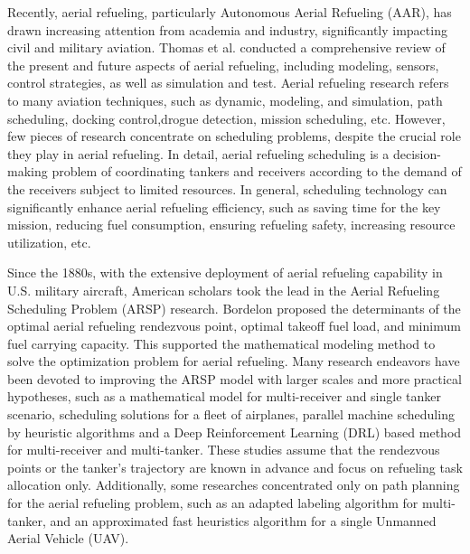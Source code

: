 Recently, aerial refueling, particularly Autonomous Aerial Refueling (AAR), has drawn increasing attention from academia and industry, significantly impacting civil and military aviation. \cite{thomas2014advances,ro2011dynamics,yin2022hose,dai2016modeling,tsukerman2018optimal}Thomas et al. conducted a comprehensive review of the present and future aspects of aerial refueling, including modeling, sensors, control strategies, as well as simulation and test. \cite{thomas2014advances}Aerial refueling research refers to many aviation techniques, such as dynamic, modeling, and simulation, \cite{ro2011dynamics,yin2022hose,dai2016modeling,tsukerman2018optimal}path scheduling, \cite{oh2013rendezvous,hansknecht2023feeder}docking control,\cite{quan2014survey,duan2020bionic,valasek2017fault,jinrui2020docking}drogue detection, \cite{rasol2023n,wang2017drogue}mission scheduling, \cite{hansknecht2023feeder,sundar2013algorithms}etc. However, few pieces of research concentrate on scheduling problems, \cite{hao2021autonomous}despite the crucial role they play in aerial refueling. In detail, aerial refueling scheduling is a decision-making problem of coordinating tankers and receivers according to the demand of the receivers subject to limited resources. In general, scheduling technology can significantly enhance aerial refueling efficiency, such as saving time for the key mission, reducing fuel consumption, ensuring refueling safety, increasing resource utilization, etc.

Since the 1880s, with the extensive deployment of aerial refueling capability in U.S. military aircraft, American scholars took the lead in the Aerial Refueling Scheduling Problem (ARSP) research. Bordelon proposed the determinants of the optimal aerial refueling rendezvous point, optimal takeoff fuel load, and minimum fuel carrying capacity. \cite{bordelon1981optimization}This supported the mathematical modeling method to solve the optimization problem for aerial refueling. Many research endeavors have been devoted to improving the ARSP model with larger scales and more practical hypotheses, such as a mathematical model for multi-receiver and single tanker scenario, \cite{liu2019optimal} scheduling solutions for a fleet of airplanes, \cite{gamzu2019polynomial,entz2015application}parallel machine scheduling by heuristic algorithms\cite{kaplan2012exact} and a Deep Reinforcement Learning (DRL) based method for multi-receiver and multi-tanker. \cite{zhu2022aerial}These studies assume that the rendezvous points or the tanker's trajectory are known in advance and focus on refueling task allocation only. Additionally, some researches concentrated only on path planning for the aerial refueling problem, such as an adapted labeling algorithm for multi-tanker, \cite{hansknecht2023feeder}and an approximated fast heuristics algorithm for a single Unmanned Aerial Vehicle (UAV). \cite{sundar2013algorithms}

